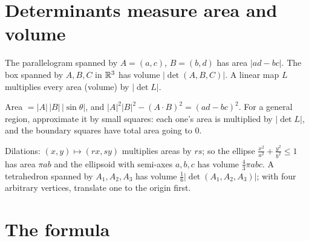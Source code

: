 \section{Determinants measure area and volume}

\begin{thm}
The parallelogram spanned by $A=(a,c)$, $B=(b,d)$ has area $|ad-bc|$. The box spanned by
$A,B,C$ in $\mathbb{R}^3$ has volume $|\det(A,B,C)|$. A linear map $L$ multiplies every area (volume)
by $|\det L|$.
\end{thm}

\begin{intuition}
Area $=|A|\,|B|\,|\sin\theta|$, and $|A|^2|B|^2-(A\cdot B)^2=(ad-bc)^2$. For a general region,
approximate it by small squares: each one's area is multiplied by $|\det L|$, and the boundary
squares have total area going to $0$.
\end{intuition}

\begin{center}
\end{center}

\begin{remember}
Dilations: $(x,y)\mapsto(rx,sy)$ multiplies areas by $rs$; so the ellipse $\frac{x^2}{a^2}+\frac{y^2}{b^2}\le1$
has area $\pi ab$ and the ellipsoid with semi-axes $a,b,c$ has volume $\frac43\pi abc$. A tetrahedron
spanned by $A_1,A_2,A_3$ has volume $\frac16|\det(A_1,A_2,A_3)|$; with four arbitrary vertices,
translate one to the origin first.
\end{remember}

\section{The formula}

